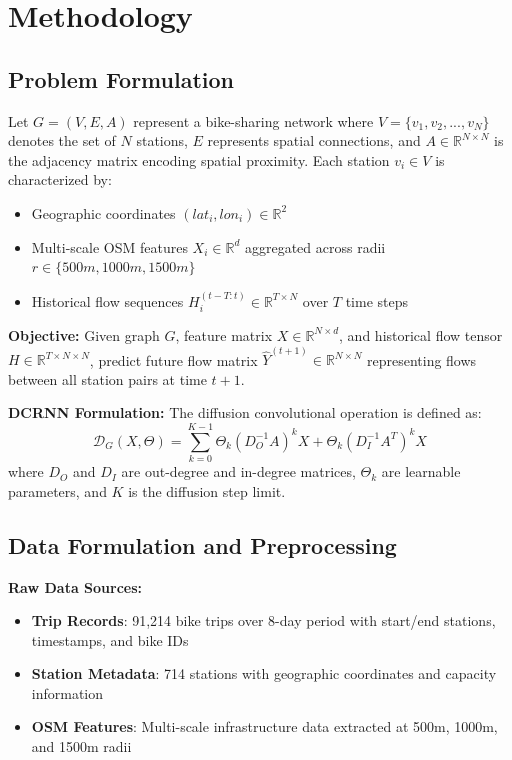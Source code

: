 \documentclass[twocolumn,11pt]{IEEEtran}
\begin{document}
\section{Methodology}

\subsection{Problem Formulation}

Let $G = (V, E, A)$ represent a bike-sharing network where $V = \{v_1, v_2, ..., v_N\}$ denotes the set of $N$ stations, $E$ represents spatial connections, and $A \in \mathbb{R}^{N \times N}$ is the adjacency matrix encoding spatial proximity. Each station $v_i \in V$ is characterized by:
\begin{itemize}
\item Geographic coordinates $(lat_i, lon_i) \in \mathbb{R}^2$
\item Multi-scale OSM features $X_i \in \mathbb{R}^d$ aggregated across radii $r \in \{500m, 1000m, 1500m\}$
\item Historical flow sequences $H_i^{(t-T:t)} \in \mathbb{R}^{T \times N}$ over $T$ time steps
\end{itemize}

\textbf{Objective:} Given graph $G$, feature matrix $X \in \mathbb{R}^{N \times d}$, and historical flow tensor $H \in \mathbb{R}^{T \times N \times N}$, predict future flow matrix $\hat{Y}^{(t+1)} \in \mathbb{R}^{N \times N}$ representing flows between all station pairs at time $t+1$.

\textbf{DCRNN Formulation:} The diffusion convolutional operation is defined as:
\begin{equation}
\mathcal{D}_G(X, \Theta) = \sum_{k=0}^{K-1} \Theta_k (D_O^{-1}A)^k X + \Theta_k (D_I^{-1}A^T)^k X
\end{equation}
where $D_O$ and $D_I$ are out-degree and in-degree matrices, $\Theta_k$ are learnable parameters, and $K$ is the diffusion step limit.

\subsection{Data Formulation and Preprocessing}

\textbf{Raw Data Sources:}
\begin{itemize}
\item \textbf{Trip Records}: 91,214 bike trips over 8-day period with start/end stations, timestamps, and bike IDs
\item \textbf{Station Metadata}: 714 stations with geographic coordinates and capacity information
\item \textbf{OSM Features}: Multi-scale infrastructure data extracted at 500m, 1000m, and 1500m radii
\end{itemize}
\end{document}
